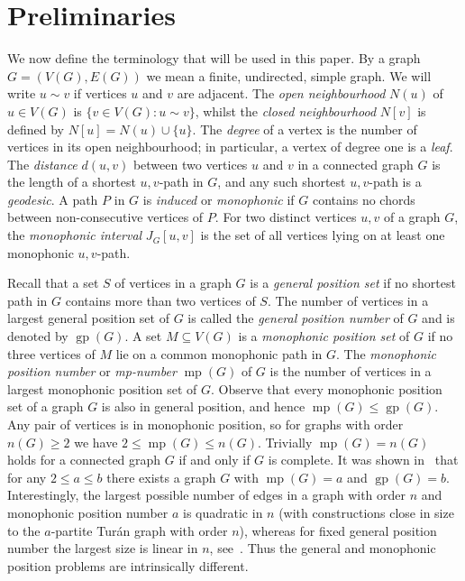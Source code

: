 \documentclass[12pt]{article}
\DeclareMathOperator {\gp} {gp}
\DeclareMathOperator {\mono} {mp}
\begin{document}
\section{Preliminaries}\label{sec:preliminary}

We now define the terminology that will be used in this paper. By a graph $G = (V(G), E(G))$ we mean a finite, undirected, simple graph. We will write $u \sim v$ if vertices $u$ and $v$ are adjacent. The \emph{open neighbourhood} $N(u)$ of $u \in V(G)$ is $\{ v \in V(G): u \sim v\} $, whilst the \emph{closed neighbourhood} $N[v]$ is defined by $N[u] = N(u) \cup \{ u\} $. The \emph{degree} of a vertex is the number of vertices in its open neighbourhood; in particular, a vertex of degree one is a \emph{leaf}. The \emph{distance} $d(u,v)$ between two vertices $u$ and $v$ in a connected graph $G$ is the length of a shortest $u,v$-path in $G$, and any such shortest $u,v$-path is a \emph{geodesic}. A path $P$ in $G$ is \emph{induced} or \emph{monophonic} if $G$ contains no chords between non-consecutive vertices of $P$. For two distinct vertices $u,v$ of a graph $G$, the \emph{monophonic interval} $J_G[u,v]$ is the set of all vertices lying on at least one monophonic $u,v$-path.  

Recall that a set $S$ of vertices in a graph $G$ is a \emph{general position set} if no shortest path in $G$ contains more than two vertices of $S$. The number of vertices in a largest general position set of $G$ is called the \emph{general position number} of $G$ and is denoted by $\gp(G)$.  A set $M \subseteq V(G)$ is a \emph{monophonic position set} of $G$ if no three vertices of $M$ lie on a common monophonic path in $G$. The \emph{monophonic position number} or \emph{mp-number} $\mono(G)$ of $G$ is the number of vertices in a largest monophonic position set of $G$. Observe that every monophonic position set of a graph $G$ is also in general position, and hence $\mono(G) \leq \gp(G)$. Any pair of vertices is in monophonic position, so for graphs with order $n(G) \geq 2$ we have $2 \leq \mono(G) \leq n(G)$. Trivially $\mono(G) = n(G)$ holds for a connected graph $G$ if and only if $G$ is complete. It was shown in~\cite{Thomas-2024b, TuiThoCha-2023+} that for any $2 \leq a \leq b$ there exists a graph $G$ with $\mono (G) = a$ and $\gp (G) = b$. Interestingly, the largest possible number of edges in a graph with order $n$ and monophonic position number $a$ is quadratic in $n$ (with constructions close in size to the $a$-partite Tur\'{a}n graph with order $n$), whereas for fixed general position number the largest size is linear in $n$, see~\cite{TuiThoCha-2023+}. Thus the general and monophonic position problems are intrinsically different. 
\end{document}
